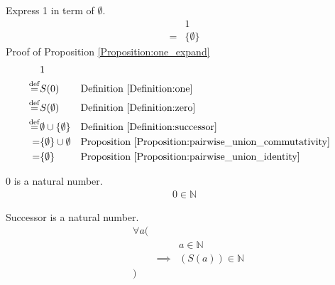 \begin{prop}
\label{Proposition:one_expand}
Express 1 in term of $\emptyset$.
\begin{align*}
& 1 \\
= & \{ \emptyset \}
\end{align*}
Proof of Proposition \ref{Proposition:one_expand}
\begin{align*}
& 1 \\
\overset{\operatorname{def}}{=} & S(0)
& & \text{Definition \ref{Definition:one}} \\
\overset{\operatorname{def}}{=} & S(\emptyset)
& & \text{Definition \ref{Definition:zero}} \\
\overset{\operatorname{def}}{=} & \emptyset \cup \{ \emptyset \}
& & \text{Definition \ref{Definition:successor}} \\
= & \{ \emptyset \} \cup \emptyset
& & \text{Proposition \ref{Proposition:pairwise_union_commutativity}} \\
= & \{ \emptyset \}
& & \text{Proposition \ref{Proposition:pairwise_union_identity}} \\
\end{align*}
\end{prop}

\begin{axm}
\label{Axiom:zero_is_natural_number}
0 is a natural number.
\begin{align*}
0 \in \mathbb{N}
\end{align*}
\end{axm}

\begin{axm}
\label{Axiom:successor_is_natural_number}
Successor is a natural number.
\begin{align*}
& \forall a ( \\
& & & a \in \mathbb{N} \\
& & \implies & (S(a)) \in \mathbb{N} \\
& )
\end{align*}
\end{axm}

